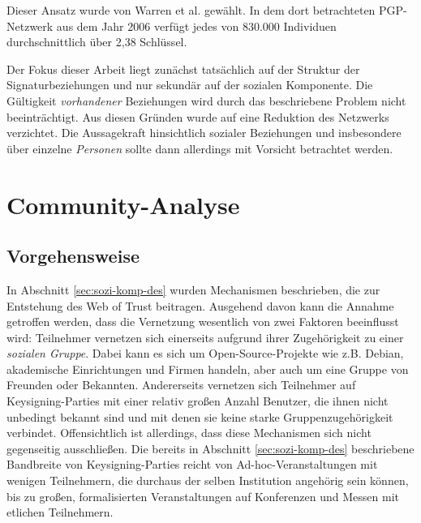 Dieser Ansatz wurde von Warren et al.\cite{Warren2007} gewählt. In
dem dort betrachteten PGP-Netzwerk aus dem Jahr 2006 verfügt jedes
von 830.000 Individuen durchschnittlich über 2,38 Schlüssel.

Der Fokus dieser Arbeit liegt zunächst tatsächlich auf der Struktur
der Signaturbeziehungen und nur sekundär auf der sozialen
Komponente. Die Gültigkeit \emph{vorhandener} Beziehungen wird durch
das beschriebene Problem nicht beeintr\"achtigt. Aus diesen Gründen
wurde auf eine Reduktion des Netzwerks verzichtet. Die Aussagekraft
hinsichtlich sozialer Beziehungen und insbesondere über einzelne
\emph{Personen} sollte dann allerdings mit Vorsicht betrachtet werden.

\section{Community-Analyse}
\label{sec:community-analyse}

\subsection{Vorgehensweise}
\label{sec:vorgehensweise}

In Abschnitt \ref{sec:sozi-komp-des} wurden Mechanismen beschrieben,
die zur Entstehung des Web of Trust beitragen. Ausgehend davon kann
die Annahme getroffen werden, dass die Vernetzung wesentlich von zwei
Faktoren beeinflusst wird: Teilnehmer vernetzen sich einerseits
aufgrund ihrer Zugehörigkeit zu einer \emph{sozialen Gruppe}. Dabei
kann es sich um Open-Source-Projekte wie z.B. Debian, akademische
Einrichtungen und Firmen handeln, aber auch um eine Gruppe von
Freunden oder Bekannten. Andererseits vernetzen sich Teilnehmer auf
Keysigning-Parties mit einer relativ großen Anzahl Benutzer, die ihnen
nicht unbedingt bekannt sind und mit denen sie keine starke
Gruppenzugehörigkeit verbindet. Offensichtlich ist allerdings, dass
diese Mechanismen sich nicht gegenseitig ausschließen. Die bereits in
Abschnitt \ref{sec:sozi-komp-des} beschriebene Bandbreite von
Keysigning-Parties reicht von Ad-hoc-Veranstaltungen mit wenigen
Teilnehmern, die durchaus der selben Institution angehörig sein
können, bis zu großen, formalisierten Veranstaltungen auf Konferenzen
und Messen mit etlichen Teilnehmern.

